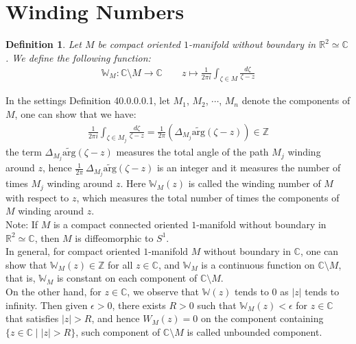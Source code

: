 \documentclass[11pt,oneside]{book}
\theoremstyle{break}
\theoremstyle{break}
\newtheorem{defn}{Definition}[corL]
\newcommand{\R}{\mathbb{R}}
\newcommand{\Z}{\mathbb{Z}}
\newcommand{\Complex}{\mathbb{C}}
\newcommand{\that}[1]{\widetilde{#1}}
\newcommand{\note}{\color{red}Note: \color{black}}
\begin{document}
\newpage
\section[Winding Numbers]{\color{red}Winding Numbers\color{black}}
\begin{defn}
Let $M$ be compact oriented $1$-manifold without boundary in $\R^2\simeq \Complex$. We define the following function:
\begin{align*}
\mathbb{W}_M: \Complex\setminus M \to \Complex  \qquad z\mapsto \frac{1}{2\pi i}\int_{\zeta \in M} \frac{d\zeta}{\zeta -z}
\end{align*}
\end{defn}

In the settings Definition 40.0.0.0.1, let $M_1$, $M_2$, $\cdots$, $M_n$ denote the components of $M$, one can show that we have:
\begin{align*}
\frac{1}{2\pi i}\int_{\zeta \in M_j}\frac{d\zeta}{\zeta- z} = \frac{1}{2\pi} \left( \Delta_{M_j} \that{\text{arg}}(\zeta - z)\right)  \in \Z
\end{align*}
the term $ \Delta_{M_j} \that{\text{arg}}(\zeta - z)$ measures the total angle of the path $M_j$ winding around $z$, hence $\frac{1}{2\pi} \ \Delta_{M_j} \that{\text{arg}}(\zeta - z)$ is an integer and it measures the number of times $M_j$ winding around $z$. Here $\mathbb{W}_M(z)$ is called the winding number of $M$ with respect to $z$, which measures the total number of times the components of $M$ winding around $z$.\\


\note If $M$ is a compact connected oriented $1$-manifold without boundary in $\R^2\simeq \Complex$, then $M$ is diffeomorphic to $S^1$.\\

In general, for compact oriented $1$-manifold $M$ without boundary in $\Complex$, one can show that $\mathbb{W}_M(z) \in \Z$ for all $z \in \Complex$, and $\mathbb{W}_M$ is a continuous function on $\Complex \setminus M$, that is, $\mathbb{W}_M$ is constant on each component of $\Complex \setminus M$. \\

On the other hand, for $z \in \Complex$, we observe that $\mathbb{W}(z)$ tends to $0$ as $|z|$ tends to infinity. Then given $\epsilon>0$, there exists $R>0$ such that $\mathbb{W}_M(z) < \epsilon$ for $z \in \Complex$ that satisfies $|z|>R$, and hence $W_M(z) = 0$ on the component containing $\{z \in \Complex \mid |z| >R\}$, such component of $\Complex \setminus M$ is called unbounded component.\\
\end{document}
